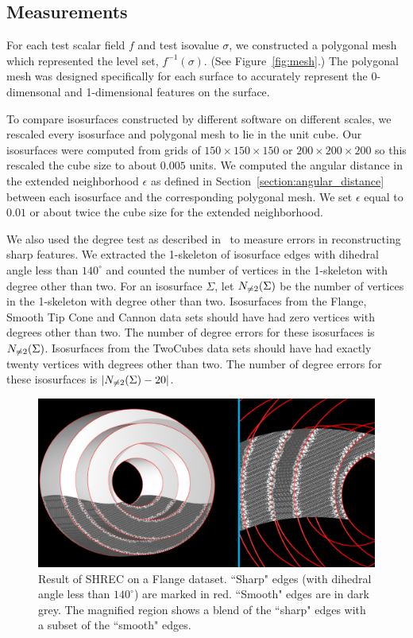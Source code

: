 \subsection{Measurements}

For each test scalar field $f$ and test isovalue $\sigma$,
we constructed a polygonal mesh which represented the level set,
$f^{-1}(\sigma)$.
(See Figure~\ref{fig:mesh}.)
The polygonal mesh was designed specifically for each surface
to accurately represent the 0-dimensonal and 1-dimensional features
on the surface.

To compare isosurfaces constructed by different software on different scales,
we rescaled every isosurface and polygonal mesh to lie in the unit cube.
Our isosurfaces were computed from grids 
of $150 \times 150 \times 150$ or $200 \times 200 \times 200$
so this rescaled the cube size to about $0.005$ units.
We computed the angular distance in the extended neighborhood $\epsilon$
as defined in Section~\ref{section:angular_distance}
between each isosurface and the corresponding polygonal mesh.
We set $\epsilon$ equal to $0.01$ or about twice the cube size
for the extended neighborhood.

We also used the degree test as described in~\cite{bw-cisec-13}
to measure errors in reconstructing sharp features.
We extracted the 1-skeleton of isosurface edges with dihedral angle 
less than $140^\circ$ and counted the number of vertices in the 1-skeleton
with degree other than two.
For an isosurface $\Sigma$,
let $N_{\neq 2}(\Sigma)$ be the number of vertices in the 1-skeleton
with degree other than two.
Isosurfaces from the Flange, Smooth Tip Cone and Cannon data sets
should have had zero vertices with degrees other than two.
The number of degree errors for these isosurfaces is $N_{\neq 2}(\Sigma)$.
Isosurfaces from the TwoCubes data sets should have had exactly
twenty vertices with degrees other than two.
The number of degree errors for these isosurfaces is $|N_{\neq 2}(\Sigma)-20|$.

\begin{figure}[tb]
\includegraphics[width=\linewidth]{images/shrecFlangeCombine2.eps}
\caption{Result of SHREC on a Flange dataset. ``Sharp" edges (with dihedral angle less than $140^\circ$) are marked in red. 
``Smooth" edges are in dark grey. The magnified region shows a blend of the ``sharp" edges with a subset of the ``smooth" edges.}
\label{fig:flange1}
\end{figure}


